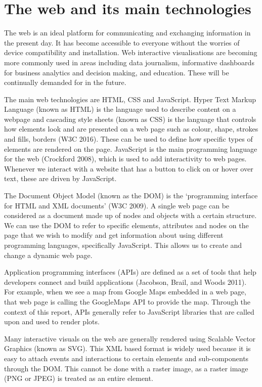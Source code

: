 \documentclass[11pt,]{report}
\begin{document}
\section{The web and its main
technologies}\label{the-web-and-its-main-technologies}

The web is an ideal platform for communicating and exchanging
information in the present day. It has become accessible to everyone
without the worries of device compatibility and installation. Web
interactive visualisations are becoming more commonly used in areas
including data journalism, informative dashboards for business analytics
and decision making, and education. These will be continually demanded
for in the future.

The main web technologies are HTML, CSS and JavaScript. Hyper Text
Markup Language (known as HTML) is the language used to describe content
on a webpage and cascading style sheets (known as CSS) is the language
that controls how elements look and are presented on a web page such as
colour, shape, strokes and fills, borders (W3C 2016). These can be used
to define how specific types of elements are rendered on the page.
JavaScript is the main programming language for the web (Crockford
2008), which is used to add interactivity to web pages. Whenever we
interact with a website that has a button to click on or hover over
text, these are driven by JavaScript.

The Document Object Model (known as the DOM) is the `programming
interface for HTML and XML documents' (W3C 2009). A single web page can
be considered as a document made up of nodes and objects with a certain
structure. We can use the DOM to refer to specific elements, attributes
and nodes on the page that we wish to modify and get information about
using different programming languages, specifically JavaScript. This
allows us to create and change a dynamic web page.

Application programming interfaces (APIs) are defined as a set of tools
that help developers connect and build applications (Jacobson, Brail,
and Woods 2011). For example, when we see a map from Google Maps
embedded in a web page, that web page is calling the GoogleMaps API to
provide the map. Through the context of this report, APIs generally
refer to JavaScript libraries that are called upon and used to render
plots.

Many interactive visuals on the web are generally rendered using
Scalable Vector Graphics (known as SVG). This XML based format is widely
used because it is easy to attach events and interactions to certain
elements and sub-components through the DOM. This cannot be done with a
raster image, as a raster image (PNG or JPEG) is treated as an entire
element.
\end{document}
